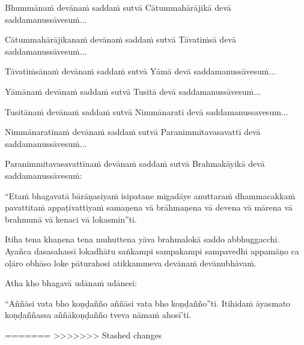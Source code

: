 \begin{pali-hang}
  Bhummānaṁ devānaṁ saddaṁ sutvā Cātummahārājikā devā saddamanussāvesuṁ...
\end{pali-hang}

\begin{pali-hang}
  Cātummahārājikanaṁ devānaṁ saddaṁ sutvā Tāvatiṁsā devā saddamanussāvesuṁ...
\end{pali-hang}

\begin{pali-hang}
  Tāvatiṁsānaṁ devānaṁ saddaṁ sutvā Yāmā devā saddamanussāvesuṁ...
\end{pali-hang}

\begin{pali-hang}
  Yāmānaṁ devānaṁ saddaṁ sutvā Tusitā devā saddamanussāvesuṁ...
\end{pali-hang}

\begin{pali-hang}
  Tusitānaṁ devānaṁ saddaṁ sutvā Nimmānaratī devā saddamanussavesum...
\end{pali-hang}

\begin{pali-hang}
  Nimmānaratīnaṁ devānaṁ saddaṁ sutvā Paranimmitavasavattī devā saddamanussāvesuṁ...
\end{pali-hang}

\begin{pali-hang}
  Paranimmitavasavattīnaṁ devānaṁ saddaṁ sutvā Brahmakāyikā devā saddamanussāvesuṁ:
\end{pali-hang}

\begin{pali-hang}
  ``Etaṁ bhagavatā bārāṇasiyaṁ isipatane migadāye anuttaraṁ dhammacakkaṁ pavattitaṁ appaṭivattiyaṁ samaṇena vā brāhmaṇena vā devena vā mārena vā brahmunā vā kenaci vā lokasmin''ti.
\end{pali-hang}

\begin{pali-hang}
  Itiha tena khaṇena tena muhuttena yāva brahmalokā saddo abbhuggacchi. Ayañca dasasahassī lokadhātu saṅkampi sampakampi sampavedhi appamāṇo ca oḷāro obhāso loke pāturahosi atikkammeva devānaṁ devānubhāvaṁ.
\end{pali-hang}

Atha kho bhagavā udānaṁ udānesi:

\begin{pali-hang}
  ``Aññāsi vata bho koṇḍañño aññāsi vata bho koṇḍañño''ti. Itihidaṁ āyasmato koṇḍaññassa aññākoṇḍañño tveva nāmaṁ ahosī'ti.
\end{pali-hang}

\suttaRef{[SN 56.11]}
=======
>>>>>>> Stashed changes

